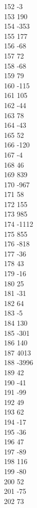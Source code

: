 { 152	-3 \\
 153	190 \\
 154	-353 \\
 155	177 \\
 156	-68 \\
 157	72 \\
 158	-68 \\
 159	79 \\
 160	-115 \\
 161	105 \\
 162	-44 \\
 163	78 \\
 164	-43 \\
 165	52 \\
 166	-120 \\
 167	-4 \\
 168	46 \\
 169	839 \\
 170	-967 \\
 171	58 \\
 172	155 \\
 173	985 \\
 174	-1112 \\
 175	855 \\
 176	-818 \\
 177	-36 \\
 178	43 \\
 179	-16 \\
 180	25 \\
 181	-31 \\
 182	64 \\
 183	-5 \\
 184	130 \\
 185	-301 \\
 186	140 \\
 187	4013 \\
 188	-3996 \\
 189	42 \\
 190	-41 \\
 191	-99 \\
 192	49 \\
 193	62 \\
 194	-17 \\
 195	-36 \\
 196	47 \\
 197	-89 \\
 198	116 \\
 199	-80 \\
 200	52 \\
 201	-75 \\
 202	73 \\
}
